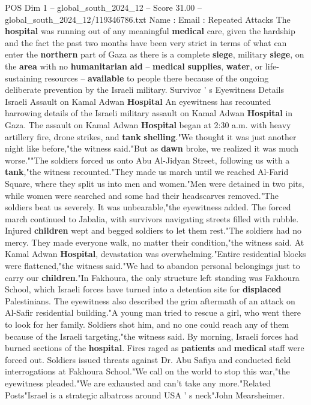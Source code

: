 \begin{textsample}{POS Dim 1 – global\_south\_2024\_12 – Score 31.00 – global\_south\_2024\_12/119346786.txt}
Name : Email : Repeated Attacks The \textbf{hospital} was running out of any meaningful \textbf{medical} care, given the hardship and the fact the past two months have been very strict in terms of what can enter the \textbf{northern} part of Gaza as there is a complete \textbf{siege}, military \textbf{siege}, on the \textbf{area} with no \textbf{humanitarian} \textbf{aid} -- \textbf{medical} \textbf{supplies}, \textbf{water}, or life-sustaining resources -- \textbf{available} to people there because of the ongoing deliberate prevention by the Israeli military.
Survivor ' s Eyewitness Details Israeli Assault on Kamal Adwan \textbf{Hospital} An eyewitness has recounted harrowing details of the Israeli military assault on Kamal Adwan \textbf{Hospital} in Gaza.
The assault on Kamal Adwan \textbf{Hospital} began at 2:30 a.m. with heavy artillery fire, drone strikes, and \textbf{tank} \textbf{shelling}."We thought it was just another night like before,"the witness said."But as \textbf{dawn} broke, we realized it was much worse.""The soldiers forced us onto Abu Al-Jidyan Street, following us with a \textbf{tank},"the witness recounted."They made us march until we reached Al-Farid Square, where they split us into men and women."Men were detained in two pits, while women were searched and some had their headscarves removed."The soldiers beat us severely.
It was unbearable,"the eyewitness added.
The forced march continued to Jabalia, with survivors navigating streets filled with rubble.
Injured \textbf{children} wept and begged soldiers to let them rest."The soldiers had no mercy.
They made everyone walk, no matter their condition,"the witness said.
At Kamal Adwan \textbf{Hospital}, devastation was overwhelming."Entire residential blocks were flattened,"the witness said."We had to abandon personal belongings just to carry our \textbf{children}."In Fakhoura, the only structure left standing was Fakhoura School, which Israeli forces have turned into a detention site for \textbf{displaced} Palestinians.
The eyewitness also described the grim aftermath of an attack on Al-Safir residential building."A young man tried to rescue a girl, who went there to look for her family.
Soldiers shot him, and no one could reach any of them because of the Israeli targeting,"the witness said.
By morning, Israeli forces had burned sections of the \textbf{hospital}.
Fires raged as \textbf{patients} and \textbf{medical} staff were forced out.
Soldiers issued threats against Dr.
Abu Safiya and conducted field interrogations at Fakhoura School."We call on the world to stop this war,"the eyewitness pleaded."We are exhausted and can't take any more."Related Posts"Israel is a strategic albatross around USA ' s neck"John Mearsheimer.

\end{textsample}
